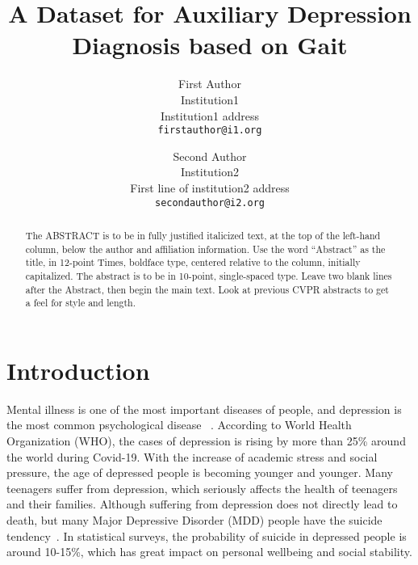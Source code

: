 \documentclass[10pt,twocolumn,letterpaper]{article}
\def\confName{CVPR}
\begin{document}
\title{A Dataset for Auxiliary Depression Diagnosis based on Gait}

\author{First Author\\
Institution1\\
Institution1 address\\
{\tt\small firstauthor@i1.org}
\and
Second Author\\
Institution2\\
First line of institution2 address\\
{\tt\small secondauthor@i2.org}
}
\maketitle

\begin{abstract}
   The ABSTRACT is to be in fully justified italicized text, at the top of the left-hand column, below the author and affiliation information.
   Use the word ``Abstract'' as the title, in 12-point Times, boldface type, centered relative to the column, initially capitalized.
   The abstract is to be in 10-point, single-spaced type.
   Leave two blank lines after the Abstract, then begin the main text.
   Look at previous CVPR abstracts to get a feel for style and length.
\end{abstract}

\section{Introduction}
\label{sec:intro}

Mental illness is one of the most important diseases of people, and depression is the most common psychological disease ~\cite{world2017depression,bhugra2004globalisation,rao2008understanding}.
According to World Health Organization (WHO), the cases of depression is rising by more than 25\% around the world during Covid-19. With the increase of academic stress and social pressure, the age of depressed people is becoming younger and younger. Many teenagers suffer from depression, which seriously affects the health of teenagers and their families.
Although suffering from depression does not directly lead to death, but many Major Depressive Disorder (MDD) people have the suicide tendency~\cite{eisenberg2007prevalence,bergfeld2018treatment,hemming2019alexithymia}.
In statistical surveys, the probability of suicide in depressed people is around 10-15\%, which has great impact on personal wellbeing and social stability.
\end{document}

